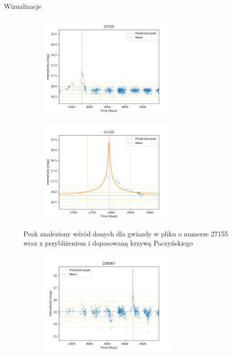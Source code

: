\documentclass[a4paper,11pt]{article}
\begin{document}
\begin{enumerate}
\begin{enumerate}
\begin{subsection}{Wizualizacje}
\begin{figure}[H]
\begin{subfigure}{0.5\textwidth}
\centering
\includegraphics[width=\linewidth,height=5.25cm]{27155.png}
\label{Fig_8}
\end{subfigure}
\begin{subfigure}{0.5\textwidth}
\centering
\includegraphics[width=\linewidth,height=5.25cm]{27155_v.png}
\label{Fig_9}
\end{subfigure}
\caption{Peak znaleziony wśród danych dla gwiazdy w pliku o numerze 27155 wraz z przybliżeniem i dopasowaną krzywą Paczyńskiego}
\end{figure}
\begin{figure}[H]
\begin{subfigure}{0.5\textwidth}
\centering
\includegraphics[width=\linewidth,height=5.25cm]{226067.png}
\label{Fig_12}
\end{subfigure}
\begin{subfigure}{0.5\textwidth}
\centering

\end{subfigure}
\end{figure}
\end{subsection}
\end{enumerate}
\end{enumerate}
\end{document}
